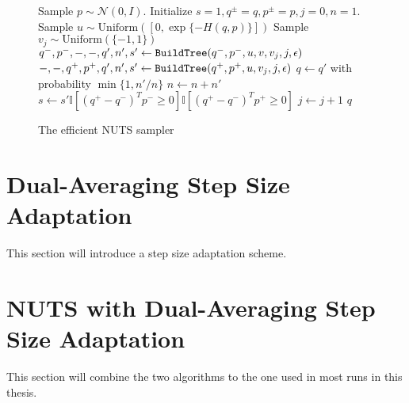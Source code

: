 \begin{figure}[H]
	\begin{algorithm}[H]
	\caption{The efficient NUTS sampler}\label{algo:efficient_nuts}
	\begin{algorithmic}
            \State Sample $p \sim \mathcal{N}(0, I)$.
            \State Initialize $s = 1, q^\pm = q, p^\pm = p, j = 0, n = 1$.
            \State Sample $u \sim \text{Uniform}([0, \exp\{-H(q, p)\}])$
                \State Sample $v_j \sim \text{Uniform}(\{-1, 1\})$
                    \State $q^-, p^-, -, -, q', n', s' \gets {\tt BuildTree}(q^-, p^-, u, v, v_j, j, \epsilon)$
                \Else
                    \State $-, -, q^+, p^+, q', n', s' \gets {\tt BuildTree}(q^+, p^+, u, v_j, j, \epsilon)$
                \EndIf
                    \State $q \gets q'$ with probability $\min\{1, n'/n\}$
                \EndIf
                \State $n \gets n + n'$
                \State $s \gets s'\mathbb{I}\left[(q^+ - q^-)^T p^- \geq 0\right] \mathbb{I}\left[(q^+ - q^-)^T p^+ \geq 0\right]$
                \State $j \gets j + 1$
            \EndWhile
            \State \Return $q$
        \EndFunction
	\end{algorithmic}
	\end{algorithm}
\end{figure}



\section{Dual-Averaging Step Size Adaptation}
This section will introduce a step size adaptation scheme.

\section{NUTS with Dual-Averaging Step Size Adaptation}
This section will combine the two algorithms to the one used in most runs in this thesis.

